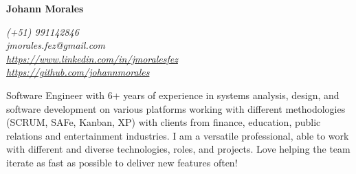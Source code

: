\documentclass{resume}
\begin{document}
\begin{multicols}{2}
\par{\Huge \textbf{Johann Morales}}\bigskip\par
\columnbreak
 \begin{flushright}
 \textit{
 (+51) 991142846 \\ 
 jmorales.fez@gmail.com \\
 \href{https://www.linkedin.com/in/jmoralesfez}{https://www.linkedin.com/in/jmoralesfez} \\
\href{https://github.com/johannmorales}{https://github.com/johannmorales} \\
 }
 \end{flushright}
\end{multicols}


Software Engineer with 6+ years of experience in systems analysis, design, and software development on various platforms working with different methodologies (SCRUM, SAFe, Kanban, XP) with clients from finance, education, public relations and entertainment industries. I am a versatile professional, able to work with different and diverse technologies, roles, and projects. Love helping the team iterate as fast as possible to deliver new features often!
\end{document}

